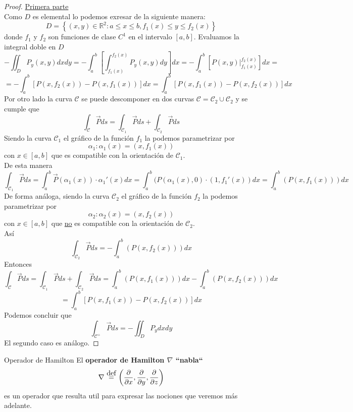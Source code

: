 \documentclass{report}
\newcommand\defeq{\stackrel{\mathclap{\normalfont\mbox{def}}}{~=~}}
\newcommand\reals{\mathds{R}}
\begin{document}
\begin{proof}
\underline{Primera parte} \\
Como $D$ es elemental lo podemos exresar de la siguiente manera:
\[
	D= \left\{ (x,y)\in \reals^2 : a \le x \le b, f_1(x) \le y \le f_2(x)\right\}
\]
donde $f_1$ y $f_2$ son funciones de clase $C^1$ en el intervalo $[a,b]$.
Evaluamos la integral doble en $D$
\[
	-\iint_D{P_y(x,y)dxdy} =
	-\int_a^b{\left[\int_{f_1(x)}^{f_2(x)}{P_y(x,y)dy} \right]dx} =
	-\int_a^b{\left[ \left.{P(x,y)}\right|_{f_1(x)}^{f_2(x)} \right]dx} =
\]
\[
	= -\int_a^b{\left[ P(x,f_2(x))-P(x,f_1(x))\right]dx}
	= \boxed{
	\int_a^b{\left[ P(x,f_1(x))-P(x,f_2(x))\right]dx}
	}
\]
Por otro lado la curva $\mathcal{C}$ se puede descomponer en dos curvas $\mathcal{C} = \mathcal{C}_2 \cup \mathcal{C}_2$ y se cumple que
\[
	\int_{\mathcal{C}}{\vec{P}ds} =
	\int_{\mathcal{C}_1}{\vec{P}ds} +
	\int_{\mathcal{C}_2}{\vec{P}ds}
\]
Siendo la curva $\mathcal{C}_1$ el gráfico de la función $f_1$ la podemos parametrizar por
\[
	\alpha_1 : \alpha_1(x) = (x,f_1(x))
\]
con $x\in [a,b]$ que es compatible con la orientación de $\mathcal{C}_1$. \\
De esta manera
\[
	\int_{\mathcal{C}_1}{\vec{P}ds} =
	\int_a^b{\vec{P}(\alpha_1(x))\cdot \alpha_1'(x)dx} =
	\int_a^b{(P(\alpha_1(x),0)\cdot (1,f_1'(x))dx} =
	\int_a^b{(P(x,f_1(x)))dx}
\]
De forma análoga,
siendo la curva $\mathcal{C}_2$ el gráfico de la función $f_2$ la podemos parametrizar por
\[
	\alpha_2 : \alpha_2(x) = (x,f_2(x))
\]
con $x\in [a,b]$ que \underline{no} es compatible con la orientación de $\mathcal{C}_2$. \\
Así
\[
	\int_{\mathcal{C}_2}{\vec{P}ds} =
	-\int_a^b{(P(x,f_2(x)))dx}
\]
Entonces
\[
	\int_{\mathcal{C}}{\vec{P}ds} =
	\int_{\mathcal{C}_1}{\vec{P}ds} +
	\int_{\mathcal{C}_2}{\vec{P}ds} =
	\int_a^b{(P(x,f_1(x)))dx}
	-\int_a^b{(P(x,f_2(x)))dx}
\]
\[
	=
	\boxed{
	\int_a^b{\left[P(x,f_1(x))-P(x,f_2(x))\right]dx}
	}
\]
Podemos concluir que
\[
	\int_{\mathcal{C}^+}{\vec{P}ds} = - \iint_D{P_ydxdy}
\]
El segundo caso es análogo.
\end{proof}


\begin{defbox}{Operador de Hamilton}
	El \textbf{operador de Hamilton $\nabla$ ``nabla``} \\
	\[
		\nabla \defeq \left(\frac{\partial}{\partial{x}},\frac{\partial}{\partial{y}},\frac{\partial}{\partial{z}}\right)
	\]
	es un operador que resulta util para expresar las nociones que veremos más adelante.
\end{defbox}
\end{document}
